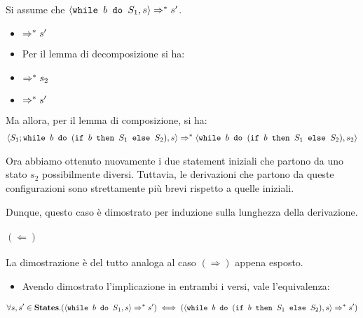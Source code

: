 Si assume che $\confSs{\wbS{b}{S_1}}{s} \Rar{*} s'$.
\begin{itemize}
  \item {} $\Rar{*} s'$ 
  \item Per il lemma di decomposizione si ha:
  \item {} $\Rar{*} s_2$
  \item {} $\Rar{*} s'$
\end{itemize}

Ma allora, per il lemma di composizione, si ha:
\begin{align*}
\confSs{S_1; \wbS{b}{(\ifABC{b}{S_1}{S_2})}}{s}
\Rar{*}
\confSs{\wbS{b}{(\ifABC{b}{S_1}{S_2})}}{s_2}
\end{align*}

Ora abbiamo ottenuto nuovamente i due statement iniziali che partono da uno
stato $s_2$ possibilmente diversi. Tuttavia, le derivazioni che partono da
queste configurazioni sono strettamente più brevi rispetto a quelle iniziali.

Dunque, questo caso è dimostrato per induzione sulla lunghezza della
derivazione.

\paragraph{$(\Leftarrow)$}

La dimostrazione è del tutto analoga al caso $(\Rightarrow)$ appena esposto.
\\
\begin{itemize}
  \item Avendo dimostrato l'implicazione in entrambi i versi, vale 
l'equivalenza: 
\end{itemize}
\begin{align*}
\forall{s,s'} \in \states.
  (\confSs{\wbS{b}{S_1}}{s} \Rar{*} s')
  \iff
  (\confSs{\wbS{b}{(\ifABC{b}{S_1}{S_2})}}{s} \Rar{*} s')
\end{align*}

\cvd


